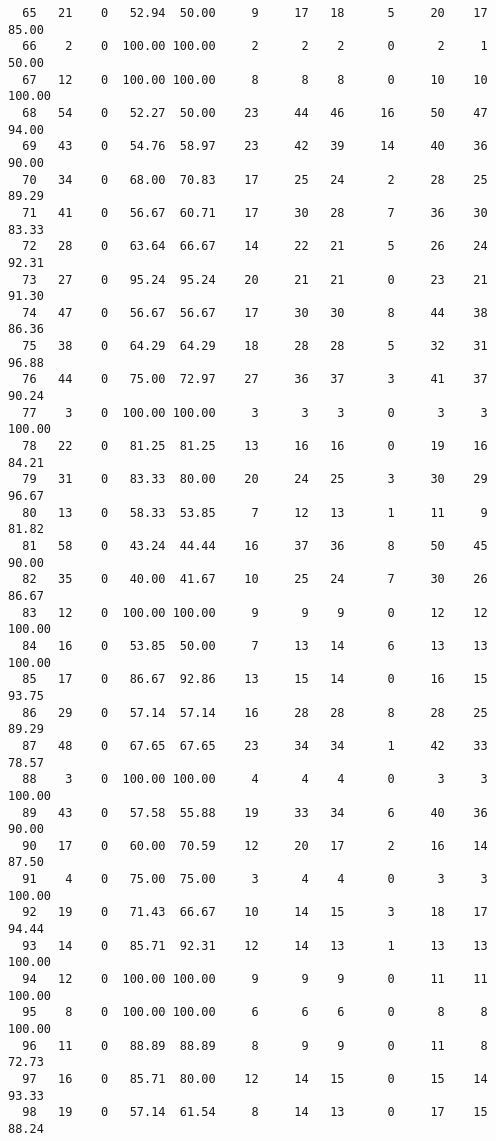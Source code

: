 \begin{verbatim}
  65   21    0   52.94  50.00     9     17   18      5     20    17    85.00
  66    2    0  100.00 100.00     2      2    2      0      2     1    50.00
  67   12    0  100.00 100.00     8      8    8      0     10    10   100.00
  68   54    0   52.27  50.00    23     44   46     16     50    47    94.00
  69   43    0   54.76  58.97    23     42   39     14     40    36    90.00
  70   34    0   68.00  70.83    17     25   24      2     28    25    89.29
  71   41    0   56.67  60.71    17     30   28      7     36    30    83.33
  72   28    0   63.64  66.67    14     22   21      5     26    24    92.31
  73   27    0   95.24  95.24    20     21   21      0     23    21    91.30
  74   47    0   56.67  56.67    17     30   30      8     44    38    86.36
  75   38    0   64.29  64.29    18     28   28      5     32    31    96.88
  76   44    0   75.00  72.97    27     36   37      3     41    37    90.24
  77    3    0  100.00 100.00     3      3    3      0      3     3   100.00
  78   22    0   81.25  81.25    13     16   16      0     19    16    84.21
  79   31    0   83.33  80.00    20     24   25      3     30    29    96.67
  80   13    0   58.33  53.85     7     12   13      1     11     9    81.82
  81   58    0   43.24  44.44    16     37   36      8     50    45    90.00
  82   35    0   40.00  41.67    10     25   24      7     30    26    86.67
  83   12    0  100.00 100.00     9      9    9      0     12    12   100.00
  84   16    0   53.85  50.00     7     13   14      6     13    13   100.00
  85   17    0   86.67  92.86    13     15   14      0     16    15    93.75
  86   29    0   57.14  57.14    16     28   28      8     28    25    89.29
  87   48    0   67.65  67.65    23     34   34      1     42    33    78.57
  88    3    0  100.00 100.00     4      4    4      0      3     3   100.00
  89   43    0   57.58  55.88    19     33   34      6     40    36    90.00
  90   17    0   60.00  70.59    12     20   17      2     16    14    87.50
  91    4    0   75.00  75.00     3      4    4      0      3     3   100.00
  92   19    0   71.43  66.67    10     14   15      3     18    17    94.44
  93   14    0   85.71  92.31    12     14   13      1     13    13   100.00
  94   12    0  100.00 100.00     9      9    9      0     11    11   100.00
  95    8    0  100.00 100.00     6      6    6      0      8     8   100.00
  96   11    0   88.89  88.89     8      9    9      0     11     8    72.73
  97   16    0   85.71  80.00    12     14   15      0     15    14    93.33
  98   19    0   57.14  61.54     8     14   13      0     17    15    88.24

\end{verbatim}
